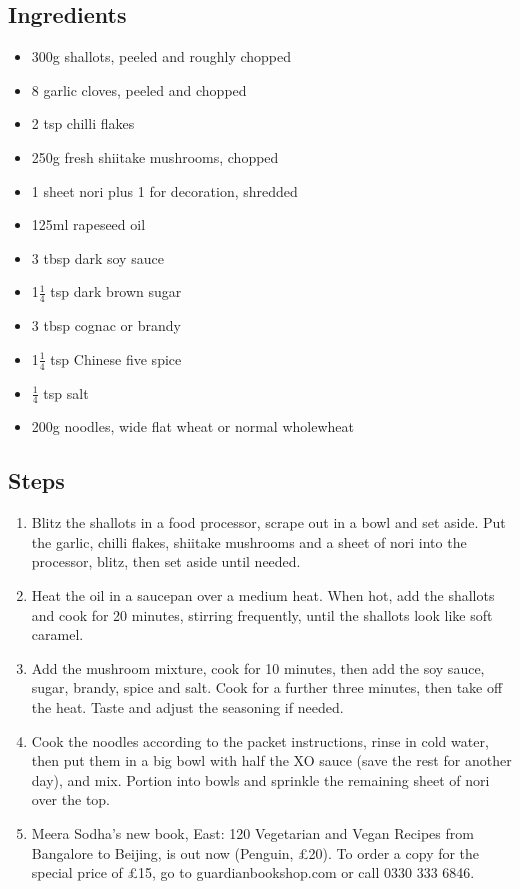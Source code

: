 \documentclass{book}
\begin{document}
\subsection*{Ingredients}
\begin{itemize}
\item 300g shallots, peeled and roughly chopped
\item 8 garlic cloves, peeled and chopped
\item 2 tsp chilli flakes
\item 250g fresh shiitake mushrooms, chopped 
\item 1 sheet nori plus 1 for decoration, shredded 
\item 125ml rapeseed oil 
\item 3 tbsp dark soy sauce 
\item 1$\frac{1}{4}$ tsp dark brown sugar 
\item 3 tbsp cognac or brandy
\item 1$\frac{1}{4}$ tsp Chinese five spice
\item $\frac{1}{4}$ tsp salt 
\item 200g noodles, wide flat wheat or normal wholewheat
\end{itemize}

\subsection*{Steps}
\begin{enumerate}
\item Blitz the shallots in a food processor, scrape out in a bowl and set aside. Put the garlic, chilli flakes, shiitake mushrooms and a sheet of nori into the processor, blitz, then set aside until needed.
\item Heat the oil in a saucepan over a medium heat. When hot, add the shallots and cook for 20 minutes, stirring frequently, until the shallots look like soft caramel. 
\item Add the mushroom mixture, cook for 10 minutes, then add the soy sauce, sugar, brandy, spice and salt. Cook for a further three minutes, then take off the heat. Taste and adjust the seasoning if needed.
\item Cook the noodles according to the packet instructions, rinse in cold water, then put them in a big bowl with half the XO sauce (save the rest for another day), and mix. Portion into bowls and sprinkle the remaining sheet of nori over the top.
\item Meera Sodha’s new book, East: 120 Vegetarian and Vegan Recipes from Bangalore to Beijing, is out now (Penguin, £20). To order a copy for the special price of £15, go to guardianbookshop.com or call 0330 333 6846.
\end{enumerate}
\newpage
\end{document}

